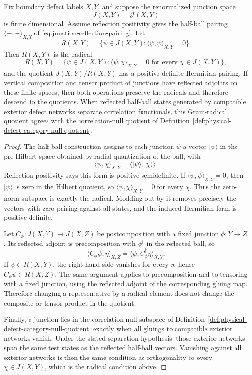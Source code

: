 \begin{proposition}
\label{prop:defect-gram-radical-null-quotient}
Fix boundary defect labels \(X,Y\), and suppose the renormalized junction
space
\[
  J(X,Y)=\mathcal J(X,Y)
\]
is finite dimensional.  Assume reflection positivity gives the half-ball
pairing \(\langle-,-\rangle_{X,Y}\) of
\eqref{eq:junction-reflection-pairing}.  Let
\begin{equation}
  R(X,Y)
  =
  \{\psi\in J(X,Y):\langle\psi,\psi\rangle_{X,Y}=0\}.
  \label{eq:defect-gram-radical}
\end{equation}
Then \(R(X,Y)\) is the radical
\[
  R(X,Y)
  =
  \{\psi\in J(X,Y):\langle\psi,\chi\rangle_{X,Y}=0
    \text{ for every }\chi\in J(X,Y)\},
\]
and the quotient \(J(X,Y)/R(X,Y)\) has a positive definite Hermitian
pairing.  If vertical composition and tensor product of junctions have
reflected adjoints on these finite spaces, then both operations preserve the
radicals and therefore descend to the quotients.  When reflected half-ball
states generated by compatible exterior defect networks separate
correlation functionals, this Gram-radical quotient agrees with the
correlation-null quotient of
Definition~\ref{def:physical-defect-category-null-quotient}.
\end{proposition}

\begin{proof}
The half-ball construction assigns to each junction \(\psi\) a vector
\(|\psi\rangle\) in the pre-Hilbert space obtained by radial quantization of
the ball, with
\[
  \langle\psi,\chi\rangle_{X,Y}
  =
  \langle |\psi\rangle,|\chi\rangle\rangle .
\]
Reflection positivity says this form is positive semidefinite.  If
\(\langle\psi,\psi\rangle_{X,Y}=0\), then \(|\psi\rangle\) is zero in the
Hilbert quotient, so
\(\langle\psi,\chi\rangle_{X,Y}=0\) for every \(\chi\).  Thus the zero-norm
subspace is exactly the radical.  Modding out by it removes precisely the
vectors with zero pairing against all states, and the induced Hermitian form
is positive definite.

Let \(C_\phi:J(X,Y)\to J(X,Z)\) be postcomposition with a fixed junction
\(\phi:Y\to Z\).  Its reflected adjoint is precomposition with
\(\phi^\dagger\) in the reflected ball, so
\[
  \langle C_\phi\psi,\eta\rangle_{X,Z}
  =
  \langle\psi,C_\phi^\dagger\eta\rangle_{X,Y}.
\]
If \(\psi\in R(X,Y)\), the right hand side vanishes for every \(\eta\), hence
\(C_\phi\psi\in R(X,Z)\).  The same argument applies to precomposition and to
tensoring with a fixed junction, using the reflected adjoint of the
corresponding gluing map.  Therefore changing a representative by a radical
element does not change the composite or tensor product in the quotient.

Finally, a junction lies in the correlation-null subspace of
Definition~\ref{def:physical-defect-category-null-quotient} exactly when all
gluings to compatible exterior networks vanish.  Under the stated separation
hypothesis, those exterior networks span the same test states as the
reflected half-ball vectors.  Vanishing against all exterior networks is then
the same condition as orthogonality to every \(\chi\in J(X,Y)\), which is the
radical condition above.
\end{proof}

